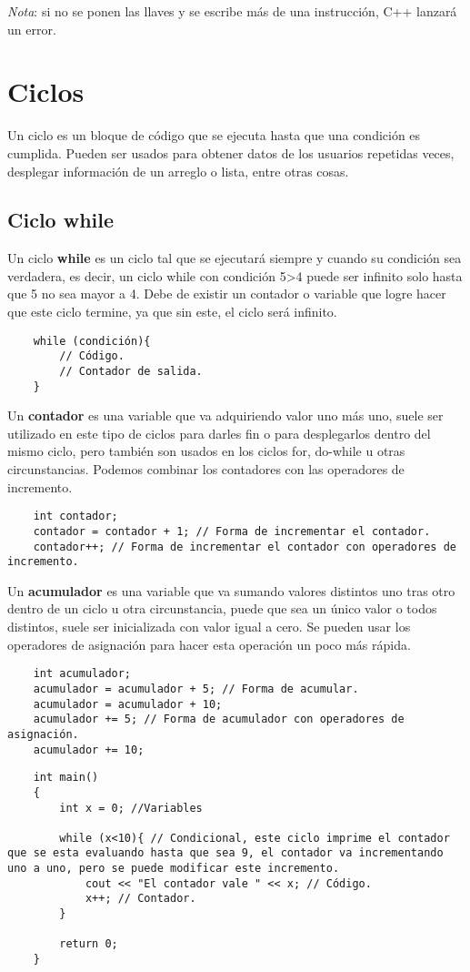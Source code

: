 \textit{Nota}: si no se ponen las llaves y se escribe más de una instrucción, C++ lanzará un error.



\section{Ciclos}

Un ciclo es un bloque de código que se ejecuta hasta que una condición es cumplida. Pueden ser usados para obtener datos de los usuarios repetidas veces, desplegar información de un arreglo o lista, entre otras cosas.


\subsection{Ciclo while}

Un ciclo \textbf{while} es un ciclo tal que se ejecutará siempre y cuando su condición sea verdadera, es decir, un ciclo while con condición 5\textgreater 4 puede ser infinito solo hasta que 5 no sea mayor a 4. Debe de existir un contador o variable que logre hacer que este ciclo termine, ya que sin este, el ciclo será infinito.
\begin{lstlisting}
    while (condición){
        // Código.
        // Contador de salida.
    }
\end{lstlisting}

Un \textbf{contador} es una variable que va adquiriendo valor uno más uno, suele ser utilizado en este tipo de ciclos para darles fin o para desplegarlos dentro del mismo ciclo, pero también son usados en los ciclos for, do-while u otras circunstancias. Podemos combinar los contadores con las operadores de incremento.
\begin{lstlisting}
    int contador;
    contador = contador + 1; // Forma de incrementar el contador.
    contador++; // Forma de incrementar el contador con operadores de incremento.
\end{lstlisting}

Un \textbf{acumulador} es una variable que va sumando valores distintos uno tras otro dentro de un ciclo u otra circunstancia, puede que sea un único valor o todos distintos, suele ser inicializada con valor igual a cero. Se pueden usar los operadores de asignación para hacer esta operación un poco más rápida.
\begin{lstlisting}
    int acumulador;
    acumulador = acumulador + 5; // Forma de acumular.
    acumulador = acumulador + 10;
    acumulador += 5; // Forma de acumulador con operadores de asignación.
    acumulador += 10;
\end{lstlisting}
\begin{lstlisting}
    int main()
    {
        int x = 0; //Variables
        
        while (x<10){ // Condicional, este ciclo imprime el contador que se esta evaluando hasta que sea 9, el contador va incrementando uno a uno, pero se puede modificar este incremento.
            cout << "El contador vale " << x; // Código.
            x++; // Contador.
        }
        
        return 0;
    }
\end{lstlisting}


